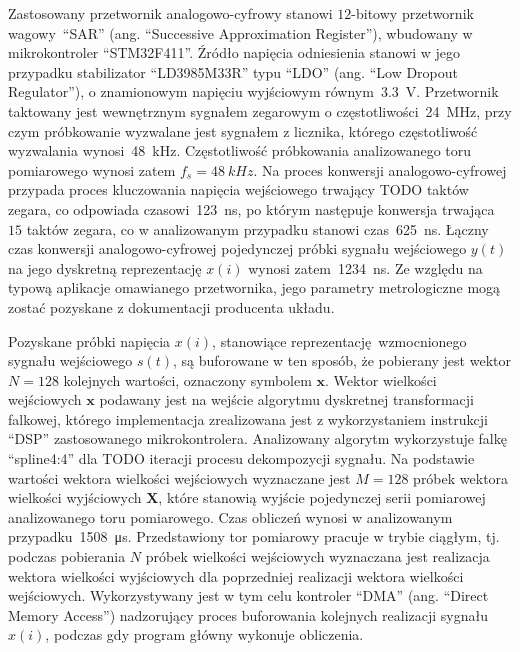 Zastosowany przetwornik analogowo-cyfrowy stanowi $12$-bitowy przetwornik wagowy~\enquote{SAR} (ang. \enquote{Successive Approximation Register}), wbudowany w mikrokontroler \enquote{STM32F411}. Źródło napięcia odniesienia stanowi w jego przypadku stabilizator \enquote{LD3985M33R} typu \enquote{LDO} (ang. \enquote{Low Dropout Regulator}), o znamionowym napięciu wyjściowym równym~\qty{3.3}{V}. Przetwornik taktowany jest wewnętrznym sygnałem zegarowym o częstotliwości~\qty{24}{MHz}, przy czym próbkowanie wyzwalane jest sygnałem z licznika, którego częstotliwość wyzwalania wynosi~\qty{48}{kHz}. Częstotliwość próbkowania analizowanego toru pomiarowego wynosi zatem $f_{s} = \qty{48}{kHz}$. Na proces konwersji analogowo-cyfrowej przypada proces kluczowania napięcia wejściowego trwający TODO taktów zegara, co odpowiada czasowi~\qty{123}{ns}, po którym następuje konwersja trwająca $15$ taktów zegara, co w analizowanym przypadku stanowi czas~\qty{625}{ns}. Łączny czas konwersji analogowo-cyfrowej pojedynczej próbki sygnału wejściowego $y(t)$ na jego dyskretną reprezentację $x(i)$ wynosi zatem~\qty{1234}{ns}. Ze względu na typową aplikacje omawianego przetwornika, jego parametry metrologiczne mogą zostać pozyskane z dokumentacji producenta układu.

Pozyskane próbki napięcia $x(i)$, stanowiące reprezentację wzmocnionego sygnału wejściowego $s(t)$, są buforowane w ten sposób, że pobierany jest wektor $N = 128$ kolejnych wartości, oznaczony symbolem $\mathbf{x}$. Wektor wielkości wejściowych $\mathbf{x}$ podawany jest na wejście algorytmu dyskretnej transformacji falkowej, którego implementacja zrealizowana jest z wykorzystaniem instrukcji \enquote{DSP} zastosowanego mikrokontrolera. Analizowany algorytm wykorzystuje falkę \enquote{spline4:4} dla TODO iteracji procesu dekompozycji sygnału. Na podstawie wartości wektora wielkości wejściowych wyznaczane jest $M = 128$ próbek wektora wielkości wyjściowych $\mathbf{X}$, które stanowią wyjście pojedynczej serii pomiarowej analizowanego toru pomiarowego. Czas obliczeń wynosi w analizowanym przypadku~\qty{1508}{\micro s}. Przedstawiony tor pomiarowy pracuje w trybie ciągłym, tj. podczas pobierania $N$ próbek wielkości wejściowych wyznaczana jest realizacja wektora wielkości wyjściowych dla poprzedniej realizacji wektora wielkości wejściowych. Wykorzystywany jest w tym celu kontroler \enquote{DMA} (ang. \enquote{Direct Memory Access}) nadzorujący proces buforowania kolejnych realizacji sygnału $x(i)$, podczas gdy program główny wykonuje obliczenia.

